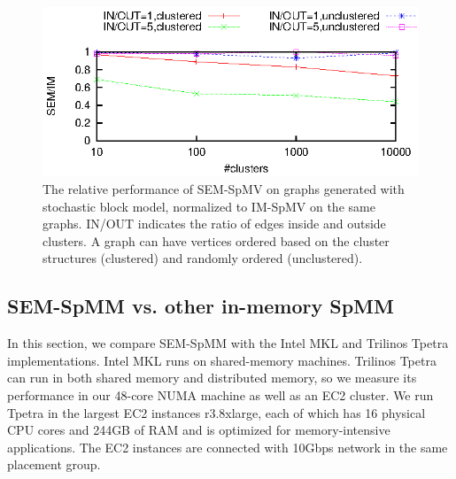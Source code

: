 \begin{figure}
	\begin{center}
		\footnotesize
		\includegraphics[scale=1]{SpMM_figs/spmm-sbm.eps}
		\caption{The relative performance of SEM-SpMV on graphs generated with
			stochastic block model, normalized to IM-SpMV on the same graphs.
			IN/OUT indicates the ratio of edges inside and outside clusters.
			A graph can have vertices ordered based on the cluster structures
		(clustered) and randomly ordered (unclustered).}
		\label{perf:spmm_sbm}
	\end{center}
\end{figure}

\subsection{SEM-SpMM vs. other in-memory SpMM}
In this section, we compare SEM-SpMM with the Intel MKL and Trilinos Tpetra
implementations. Intel MKL runs on shared-memory machines. Trilinos Tpetra can run in
both shared memory and distributed memory, so we measure its performance in
our 48-core NUMA machine as well as an EC2 cluster. We run Tpetra in the largest
EC2 instances r3.8xlarge, each of which has 16 physical CPU cores and 244GB of RAM
and is optimized for memory-intensive applications. The EC2 instances are
connected with 10Gbps network in the same placement group.

